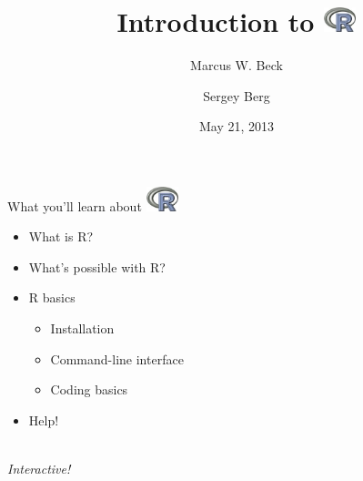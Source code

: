 \documentclass[xcolor=svgnames]{beamer}
\begin{document}


\title[Intro to R]{Introduction to \includegraphics[width=0.07\textwidth]{Rlogo.jpg}}
\author[M. Beck and S. Berg]{Marcus W. Beck \and Sergey Berg}


\date{May 21, 2013}


\begin{frame}
\vspace{-0.3in}
\titlepage
\end{frame}

\begin{frame}{What you'll learn about \hspace{0.2em}\includegraphics[width=0.07\textwidth]{Rlogo.jpg}}
\begin{itemize}
\itemsep15pt
\item What is R?
\item What's possible with R?
\item R basics
\begin{itemize}
\item Installation
\item Command-line interface
\item Coding basics
\end{itemize}
\item Help!\\~\\
\end{itemize}
\Large
\centerline{\emph{Interactive!}}
\end{frame}
\end{document}

